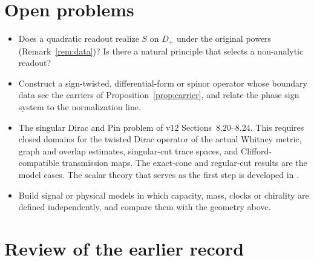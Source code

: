 \documentclass[11pt]{article}
\theoremstyle{definition}\newtheorem{definition}[theorem]{Definition}
\theoremstyle{remark}\newtheorem{remark}[theorem]{Remark}
\begin{document}
\section{Open problems}\label{sec:open}
\begin{itemize}
\item Does a quadratic readout realize $S$ on $D_+$ under the original powers
(Remark~\ref{rem:data})? Is there a natural principle that selects a
non-analytic readout?
\item Construct a sign-twisted, differential-form or spinor operator whose boundary data
see the carriers of Proposition~\ref{prop:carrier}, and relate the phase sign
system to the normalization line.
\item The singular Dirac and Pin problem of v12 Sections~8.20--8.24. This
requires closed domains for the twisted Dirac operator of the actual Whitney
metric, graph and overlap estimates, singular-cut trace spaces, and
Clifford-compatible transmission maps. The exact-cone and regular-cut results
are the model cases. The scalar theory that serves as the first step is
developed in \cite{companion}.
\item Build signal or physical models in which capacity, mass, clocks or
chirality are defined independently, and compare them with the geometry above.
\end{itemize}

\appendix
\section{Review of the earlier record}\label{app:corrections}
\end{document}
